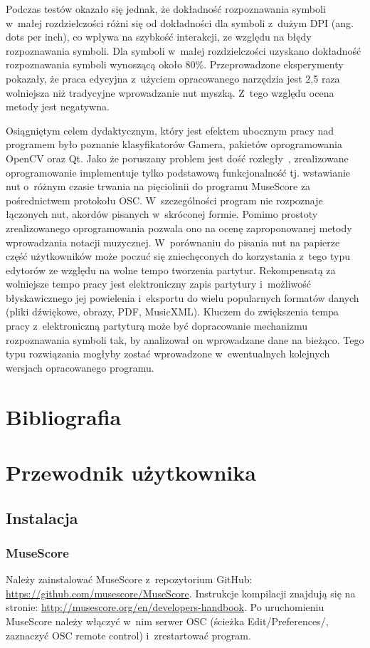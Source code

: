 \documentclass[polish,thesis,12pt]{dcsbook}
\begin{document}
Podczas testów okazało się jednak, że dokładność rozpoznawania symboli w~małej rozdzielczości różni się od dokładności dla symboli z~dużym DPI (ang. dots per inch), co wpływa na szybkość interakcji, ze względu na błędy rozpoznawania symboli. Dla symboli w~małej rozdzielczości uzyskano dokładność rozpoznawania symboli wynoszącą około 80\%. Przeprowadzone eksperymenty pokazały, że praca edycyjna z~użyciem opracowanego narzędzia jest 2,5 raza wolniejsza niż tradycyjne wprowadzanie nut myszką. Z~tego względu ocena metody jest negatywna.

Osiągniętym celem dydaktycznym, który jest efektem ubocznym pracy nad programem było poznanie 
klasyfikatorów Gamera, pakietów oprogramowania OpenCV oraz Qt. Jako że poruszany problem jest dość rozległy~\cite{bainb2001}, zrealizowane oprogramowanie implementuje tylko podstawową funkcjonalność tj. wstawianie nut o~różnym czasie trwania na pięciolinii do programu MuseScore za pośrednictwem protokołu OSC. W~szczególności program nie rozpoznaje łączonych nut, akordów pisanych w~skróconej formie. Pomimo prostoty zrealizowanego oprogramowania pozwala ono na ocenę zaproponowanej metody wprowadzania notacji muzycznej. W~porównaniu do pisania nut na papierze część użytkowników może poczuć się zniechęconych do korzystania z~tego typu edytorów ze względu na wolne tempo tworzenia partytur. Rekompensatą za wolniejsze tempo pracy jest elektroniczny zapis partytury i~możliwość błyskawicznego jej powielenia i~eksportu do wielu popularnych formatów danych (pliki dźwiękowe, obrazy, PDF, MusicXML). Kluczem do zwiększenia tempa pracy z~elektroniczną partyturą może być dopracowanie mechanizmu rozpoznawania symboli tak, by analizował on wprowadzane dane na bieżąco. Tego typu rozwiązania mogłyby zostać wprowadzone w~ewentualnych kolejnych wersjach opracowanego programu.

{
  \backmatter
  \chapter{Bibliografia}
  \printbibliography[heading=none,sorting=title]
}
\listoffigures
\listoftables

\appendix
\chapter{Przewodnik użytkownika}
\section{Instalacja}
\subsection{MuseScore}
Należy zainstalować MuseScore z~repozytorium GitHub: \url{https://github.com/musescore/MuseScore}. Instrukcje kompilacji znajdują się na stronie: \url{http://musescore.org/en/developers-handbook}. Po uruchomieniu MuseScore należy włączyć w~nim serwer OSC (ścieżka Edit/Preferences/, zaznaczyć OSC remote control) i~zrestartować program.
\end{document}
